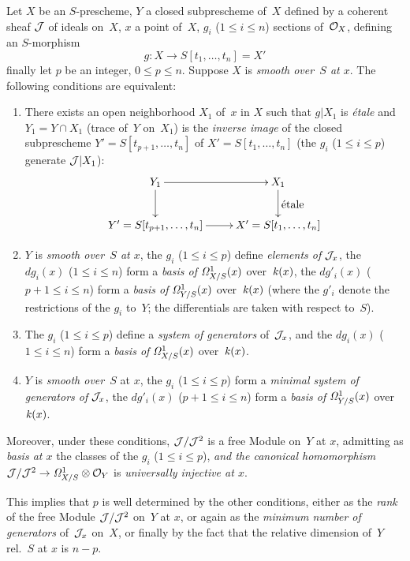\begin{proposition}
\label{II.4.9}
Let $X$ be an $S$-prescheme, $Y$ a closed subprescheme
of~$X$ defined by a coherent sheaf $\cal{J}$
of ideals on~$X$, $x$ a point of~$X$, $g_i$ ($1 \leq i \leq n$)
sections of~$\cal{O}_X$, defining an $S$-morphism
\[
g \colon X \to S[t_1,\dots,t_n] = X'
\]
finally let $p$ be an integer, $0 \leq p \leq n$. Suppose $X$ is
\emph{smooth over~$S$ at $x$}. The following conditions are equivalent:
\begin{enumerate}
\item[(i)] There exists an open neighborhood $X_1$ of~$x$ in $X$ such that
$g|X_1$ is \emph{\'etale} and $Y_1=Y \cap X_1$ (trace of~$Y$
on~$X_1$) is the \emph{inverse image} of the closed subprescheme
$Y'=S[t_{p+1},\dots,t_n]$
of
$X'=S[t_1,\dots,t_n]$ (\ie the $g_i$ ($1 \leq i \leq p$) generate
$\cal{J}|X_1$):
\[
\xymatrix{ Y_1 \ar[d] \ar[r] & X_1 \ar[d]^{\hbox{\'etale}} \\
Y'=S[t_{p+1},\dots, t_n] \ar[r] & X'=S[t_1,\dots,t_n]}
\]
\item[(ii)]
$Y$ is \emph{smooth over~$S$ at $x$}, the $g_i$ ($1 \leq i \leq p$)
define \emph{elements of} $\cal{J}_x$, the $d
g_i(x)$ ($1 \leq i \leq n$) form a \emph{basis of}
$\it{\Omega}^1_{X/S}(x)$ over~$\kres(x)$, the $dg'_i(x)$ ($p+1 \leq i \leq
n$) form a \emph{basis of} $\it{\Omega}^1_{Y/S}(x)$ over~$\kres(x)$
(where the $g'_i$ denote the restrictions of the $g_i$ to~$Y$;
the differentials are taken with respect to~$S$).
\item[(iii)] The $g_i$ ($1 \leq i \leq p$) define a
\emph{system of generators} of~$\cal{J}_x$, and the
$dg_i(x)$ ($1 \leq i \leq n$) form a \emph{basis of}
$\it{\Omega}^1_{X/S}(x)$ over~$\kres(x)$.
\item[(iv)] $Y$ is \emph{smooth over~$S$} at $x$, the $g_i$
($1 \leq i \leq p$)
form a \emph{minimal system of generators of}
$\cal{J}_x$, the $dg'_i(x)$ ($p+1 \leq i \leq n$) form a
\emph{basis of} $\it{\Omega}^1_{Y/S}(x)$ over~$\kres(x)$.
\end{enumerate}

Moreover, under these conditions, $\cal{J}/\cal{J}^2$ is a free Module
on~$Y$ at $x$, admitting as \emph{basis at $x$} the classes of the
$g_i$ ($1 \leq i \leq p$), \emph{and the canonical homomorphism}
$\cal{J}/\cal{J}^2 \to \it{\Omega}^1_{X/S} \otimes \cal{O}_Y$ is
\emph{universally injective at $x$}.
\end{proposition}

\begin{remarkstar}
This implies that $p$ is well determined by the other
conditions, either as the \emph{rank} of the free Module
$\cal{J}/\cal{J}^2$ on~$Y$ at $x$, or again as the \emph{minimum
number of generators} of~$\cal{J}_x$ on~$X$, or finally by the fact
that the relative dimension of~$Y$ rel.\ $S$ at $x$ is $n-p$.
\end{remarkstar}

